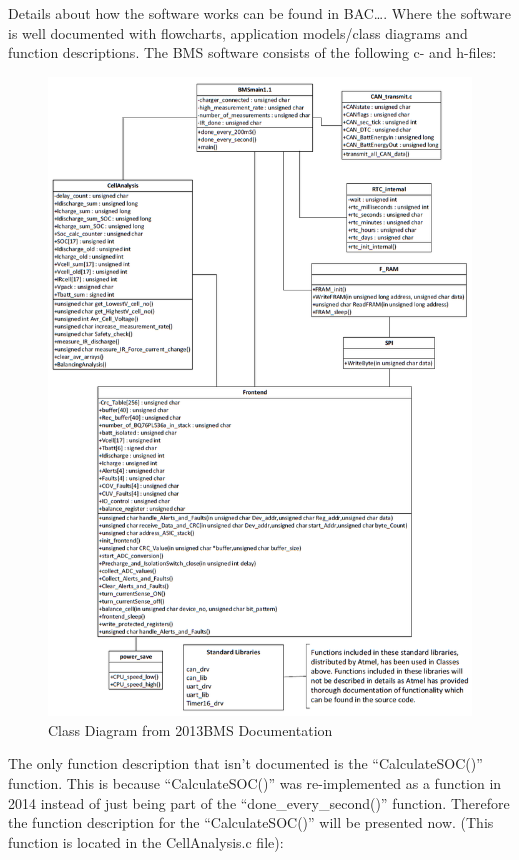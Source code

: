 Details about how the software works can be found in BAC…. Where the software is well documented with flowcharts, application models/class diagrams and function descriptions.
The BMS software consists of the following c- and h-files:\\
\begin{figure}[H]
	\centering
	\includegraphics[width=1.0\linewidth]{Software/BMS-ClassDiagram.PNG}
	\caption{Class Diagram from 2013BMS Documentation}
	\label{fig:SOFTWARE_BMS}
\end{figure}
The only function description that isn’t documented is the “CalculateSOC()” function. This is because “CalculateSOC()” was re-implemented as a function in 2014 instead of just being part of the “done\_every\_second()” function. Therefore the function description for the “CalculateSOC()” will be presented now. (This function is located in the CellAnalysis.c file):
